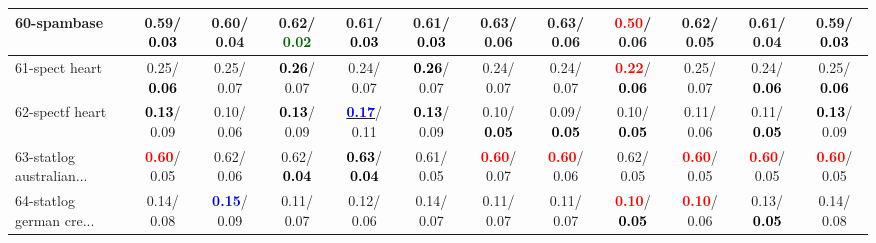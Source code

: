 \begin{table}[h]
\begin{center}
{\begin{tabular}{lc|c|c|c|c|c|c|c|c|c|c}
60-spambase &   0.59/\textcolor{black}{\textbf{  0.03}} &   0.60/  0.04 &   0.62/\textcolor{darkgreen}{\textbf{  0.02}} &   0.61/\textcolor{black}{\textbf{  0.03}} &   0.61/\textcolor{black}{\textbf{  0.03}} &   0.63/  0.06 &   0.63/  0.06 & \textcolor{red}{\textbf{  0.50}}/  0.06 &   0.62/  0.05 &   0.61/  0.04 &   0.59/\textcolor{black}{\textbf{  0.03}} \\ \hline
61-spect heart &   0.25/\textcolor{black}{\textbf{  0.06}} &   0.25/  0.07 & \textcolor{black}{\textbf{  0.26}}/  0.07 &   0.24/  0.07 & \textcolor{black}{\textbf{  0.26}}/  0.07 &   0.24/  0.07 &   0.24/  0.07 & \textcolor{red}{\textbf{  0.22}}/\textcolor{black}{\textbf{  0.06}} &   0.25/  0.07 &   0.24/\textcolor{black}{\textbf{  0.06}} &   0.25/\textcolor{black}{\textbf{  0.06}} \\
62-spectf heart & \textcolor{black}{\textbf{  0.13}}/  0.09 &   0.10/  0.06 & \textcolor{black}{\textbf{  0.13}}/  0.09 & \underline{\textcolor{blue}{\textbf{  0.17}}}/  0.11 & \textcolor{black}{\textbf{  0.13}}/  0.09 &   0.10/\textcolor{black}{\textbf{  0.05}} &   0.09/\textcolor{black}{\textbf{  0.05}} &   0.10/\textcolor{black}{\textbf{  0.05}} &   0.11/  0.06 &   0.11/\textcolor{black}{\textbf{  0.05}} & \textcolor{black}{\textbf{  0.13}}/  0.09 \\
63-statlog australian... & \textcolor{red}{\textbf{  0.60}}/  0.05 &   0.62/  0.06 &   0.62/\textcolor{black}{\textbf{  0.04}} & \textcolor{black}{\textbf{  0.63}}/\textcolor{black}{\textbf{  0.04}} &   0.61/  0.05 & \textcolor{red}{\textbf{  0.60}}/  0.07 & \textcolor{red}{\textbf{  0.60}}/  0.06 &   0.62/  0.05 & \textcolor{red}{\textbf{  0.60}}/  0.05 & \textcolor{red}{\textbf{  0.60}}/  0.05 & \textcolor{red}{\textbf{  0.60}}/  0.05 \\
64-statlog german cre... &   0.14/  0.08 & \textcolor{blue}{\textbf{  0.15}}/  0.09 &   0.11/  0.07 &   0.12/  0.06 &   0.14/  0.07 &   0.11/  0.07 &   0.11/  0.07 & \textcolor{red}{\textbf{  0.10}}/\textcolor{black}{\textbf{  0.05}} & \textcolor{red}{\textbf{  0.10}}/  0.06 &   0.13/\textcolor{black}{\textbf{  0.05}} &   0.14/  0.08 \\\end{tabular}}\label{stratsALCKappa1aSVMRedux}
\end{center}
\end{table}

